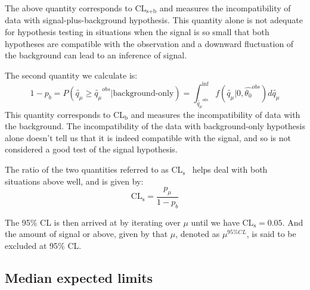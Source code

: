 The above quantity corresponds to CL$_\text{s+b}$ and measures the incompatibility of data with signal-plus-background hypothesis. This quantity alone is not adequate for hypothesis testing in situations when the signal is so small that both hypotheses are compatible with the observation and a downward fluctuation of the background can lead to an inference of signal.

The second quantity we calculate is:
\begin{equation}                                                                                                                          
  \label{eq:pb}                                                     
  1-p_b=P(\tilde{q_\mu}\geq \tilde{q_\mu}^{obs}|\text{background-only})=\int_{\tilde{q_\mu}^{obs}}^{\inf}f(\tilde{q_\mu}|0,\hat{\theta_0}^{obs})d\tilde{q_\mu}                                                                                                            
\end{equation}
This quantity corresponds to CL$_\text{b}$ and measures the incompatibility of data with the background. The incompatibility of the data with background-only hypothesis alone doesn't tell us that it is indeed compatible with the signal, and so is not considered a good test of the signal hypothesis.

The ratio of the two quantities referred to as CL$_\text{s}$~\cite{cls1,cls2,cls3} helps deal with both situations above well, and is given by:
\begin{equation}                                                                                                                          
  \label{eq:cls}                                                                                                                           \text{CL}_\text{s}=\frac{p_\mu}{1-p_b}
\end{equation}

The 95\% CL is then arrived at by iterating over $\mu$ until we have CL$_\text{s}=0.05$. And the amount of signal or above, given by that $\mu$, denoted as $\mu^{95\%CL}$, is said to be excluded at 95\% CL. 

\subsection{Median expected limits}

